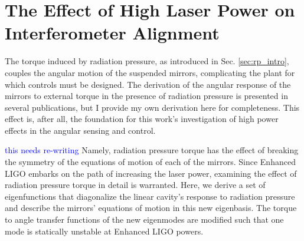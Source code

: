 \chapter{The Effect of High Laser Power on Interferometer Alignment}
\label{ch:eigenmodes}



The torque induced by radiation pressure, as introduced in
Sec. \ref{sec:rp_intro}, couples the angular motion of the suspended
mirrors, complicating the plant for which controls must be
designed. The derivation of the angular response of the mirrors to
external torque in the presence of radiation pressure is presented in
several publications, but I provide my own derivation here for
completeness. This effect is, after all, the foundation for this
work's investigation of high power effects in the angular sensing and
control.

\textcolor{blue}{this needs re-writing} Namely, radiation pressure
torque has the effect of breaking the symmetry of the equations of
motion of each of the mirrors. Since Enhanced LIGO embarks on the path
of increasing the laser power, examining the effect of radiation
pressure torque in detail is warranted. Here, we derive a set of
eigenfunctions that diagonalize the linear cavity's response to
radiation pressure and describe the mirrors' equations of motion in
this new eigenbasis. The torque to angle transfer functions of the new
eigenmodes are modified such that one mode is statically unstable at
Enhanced LIGO powers.




